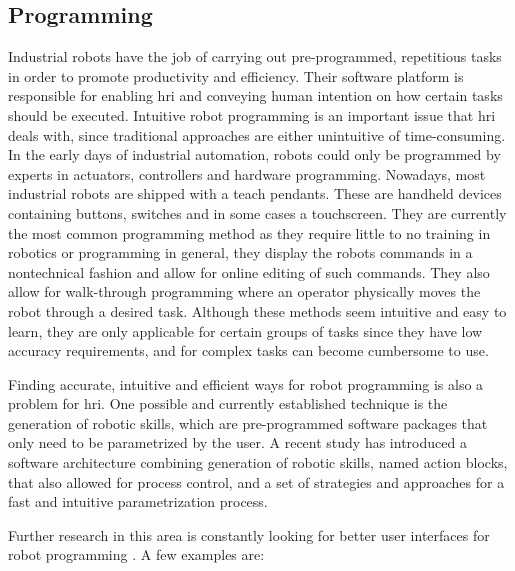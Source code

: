 \subsection{Programming}

\par Industrial robots have the job of carrying out pre-programmed, repetitious tasks in order to promote productivity and efficiency. Their software platform is responsible for enabling \ac{hri} and conveying human intention on how certain tasks should be executed. Intuitive robot programming is an important issue that \ac{hri} deals with, since traditional approaches are either unintuitive of time-consuming. In the early days of industrial automation, robots could only be programmed by experts in actuators, controllers and hardware programming. Nowadays, most industrial robots are shipped with a teach pendants. These are handheld devices containing buttons, switches and in some cases a touchscreen. They are currently the most common programming method as they require little to no training in robotics or programming in general, they display the robots commands in a nontechnical fashion and allow for online editing of such commands. They also allow for walk-through programming where an operator physically moves the robot through a desired task. Although these methods seem intuitive and easy to learn, they are only applicable for certain groups of tasks since they have low accuracy requirements, and for complex tasks can become cumbersome to use.

\par Finding accurate, intuitive and efficient ways for robot programming is also a problem for \ac{hri}. One possible and currently established technique is the generation of robotic skills, which are pre-programmed software packages that only need to be parametrized by the user. A recent study \cite{cobot.skill} has introduced a software architecture combining generation of robotic skills, named action blocks, that also allowed for process control, and a set of strategies and approaches for a fast and intuitive parametrization process.

\par Further research in this area is constantly looking for better user interfaces for robot programming \cite{paper.review.1, cobot.reality}. A few examples are:

